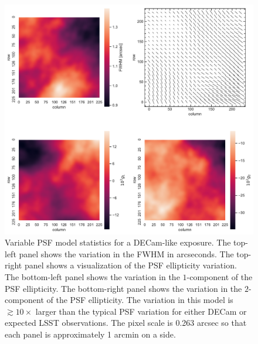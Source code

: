 \documentclass[fleqn,useAMS,usenatbib]{mnras}
\begin{document}
\begin{figure}
  \includegraphics[width=\textwidth]{figures/pspsf.pdf}
  \caption{
    Variable PSF model statistics for a DECam-like exposure. The top-left
    panel shows the variation in the FWHM in arcseconds. The top-right panel
    shows a visualization of the PSF ellipticity variation. The bottom-left panel shows
    the variation in the $1$-component of the PSF ellipticity. The bottom-right panel
    shows the variation in the $2$-component of the PSF ellipticity. The variation in
    this model is $\gtrsim10\times$ larger than the typical PSF variation for
    either DECam or expected LSST observations. The pixel scale is 0.263 arcsec
    so that each panel is approximately 1 arcmin on a side.
    \label{fig:pspsf}}
\end{figure}
\end{document}
